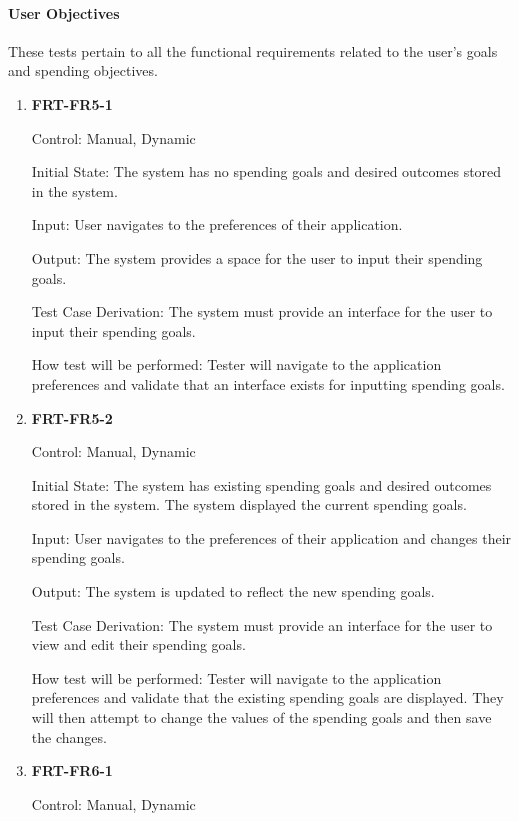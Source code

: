 \documentclass[12pt, titlepage]{article}
\begin{document}
\paragraph{User Objectives}

These tests pertain to all the functional requirements related to the user's goals and spending objectives.

\begin{enumerate}

\item{\textbf{FRT-FR5-1}}

Control: Manual, Dynamic
          
Initial State: The system has no spending goals and desired outcomes stored in the system.

Input: User navigates to the preferences of their application.
          
Output: The system provides a space for the user to input their spending goals.

Test Case Derivation: The system must provide an interface for the user to input their spending goals.
          
How test will be performed: Tester will navigate to the application preferences and validate that an interface exists for inputting spending goals.

\item{\textbf{FRT-FR5-2}}

Control: Manual, Dynamic
          
Initial State: The system has existing spending goals and desired outcomes stored in the system. The system displayed the current spending goals.

Input: User navigates to the preferences of their application and changes their spending goals.
          
Output: The system is updated to reflect the new spending goals.

Test Case Derivation: The system must provide an interface for the user to view and edit their spending goals.
          
How test will be performed: Tester will navigate to the application preferences and validate that the existing spending goals are displayed. They will then attempt to change the values of the spending goals and then save the changes.

\item{\textbf{FRT-FR6-1}}

Control: Manual, Dynamic
          

\end{enumerate}
\end{document}
